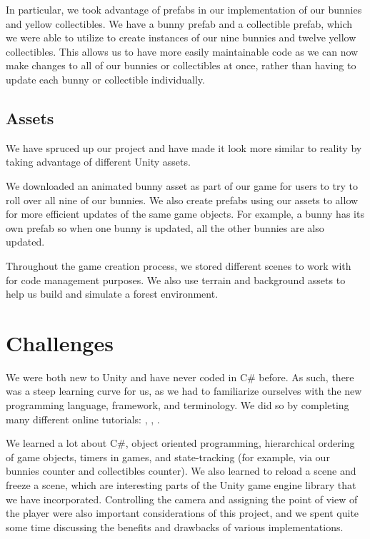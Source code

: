 \documentclass[12pt]{article}
\begin{document}
  In particular, we took advantage of prefabs in our implementation of our bunnies and yellow collectibles. We have a bunny prefab and a collectible prefab, which we were able to utilize to create instances of our nine bunnies and twelve yellow collectibles. This allows us to have more easily maintainable code as we can now make changes to all of our bunnies or collectibles at once, rather than having to update each bunny or collectible individually.


\subsection{Assets}
  We have spruced up our project and have made it look more similar to reality by taking advantage of different Unity assets.
  
  We downloaded an animated bunny asset as part of our game for users to try to roll over all nine of our bunnies. We also create prefabs using our assets to allow for more efficient updates of the same game objects. For example, a bunny has its own prefab so when one bunny is updated, all the other bunnies are also updated. 
 
  Throughout the game creation process, we stored different scenes to work with for code management purposes. We also use terrain and background assets to help us build and simulate a forest environment. 


\section{Challenges}
We were both new to Unity and have never coded in C\# before. As such, there was a steep learning curve for us, as we had to familiarize ourselves with the new programming language, framework, and terminology. We did so by completing many different online tutorials: \cite{tutorial-rab}, \cite{tutorial1}, \cite{tutorial-wam}.

We learned a lot about C\#, object oriented programming, hierarchical ordering of game objects, timers in games, and state-tracking (for example, via our bunnies counter and collectibles counter). We also learned to reload a scene and freeze a scene, which are interesting parts of the Unity game engine library that we have incorporated. Controlling the camera and assigning the point of view of the player were also important considerations of this project, and we spent quite some time discussing the benefits and drawbacks of various implementations.
\end{document}
